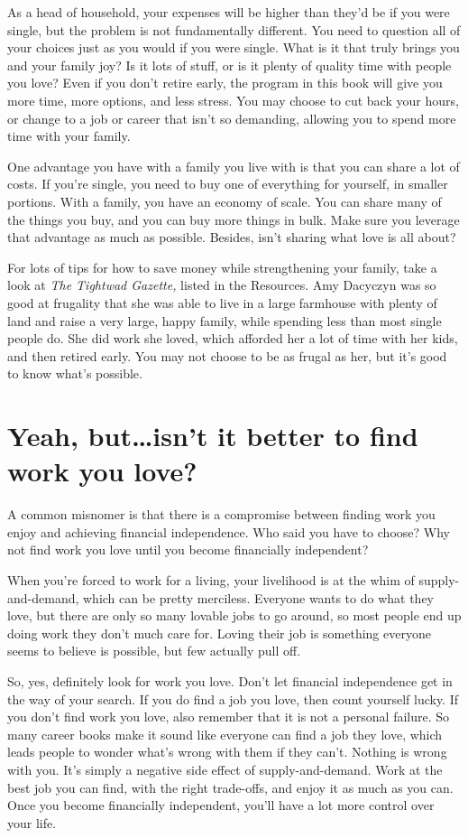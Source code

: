 As a head of household, your expenses will be higher than they'd be if you were single, but the problem is not fundamentally different. You need to question all of your choices just as you would if you were single. What is it that truly brings you and your family joy? Is it lots of stuff, or is it plenty of quality time with people you love? Even if you don't retire early, the program in this book will give you more time, more options, and less stress. You may choose to cut back your hours, or change to a job or career that isn't so demanding, allowing you to spend more time with your family.

One advantage you have with a family you live with is that you can share a lot of costs. If you're single, you need to buy one of everything for yourself, in smaller portions. With a family, you have an economy of scale. You can share many of the things you buy, and you can buy more things in bulk. Make sure you leverage that advantage as much as possible. Besides, isn't sharing what love is all about?

For lots of tips for how to save money while strengthening your family, take a look at \emph{The Tightwad Gazette,} listed in the Resources. Amy Dacyczyn was so good at frugality that she was able to live in a large farmhouse with plenty of land and raise a very large, happy family, while spending less than most single people do. She did work she loved, which afforded her a lot of time with her kids, and then retired early. You may not choose to be as frugal as her, but it's good to know what's possible.

\section{Yeah, but\ldots isn't it better to find work you love?}
A common misnomer is that there is a compromise between finding work you enjoy and achieving financial independence. Who said you have to choose? Why not find work you love until you become financially independent?

When you're forced to work for a living, your livelihood is at the whim of supply-and-demand, which can be pretty merciless. Everyone wants to do what they love, but there are only so many lovable jobs to go around, so most people end up doing work they don't much care for. Loving their job is something everyone seems to believe is possible, but few actually pull off.

So, yes, definitely look for work you love. Don't let financial independence get in the way of your search. If you do find a job you love, then count yourself lucky. If you don't find work you love, also remember that it is not a personal failure. So many career books make it sound like everyone can find a job they love, which leads people to wonder what's wrong with them if they can't. Nothing is wrong with you. It's simply a negative side effect of supply-and-demand. Work at the best job you can find, with the right trade-offs, and enjoy it as much as you can. Once you become financially independent, you'll have a lot more control over your life.

